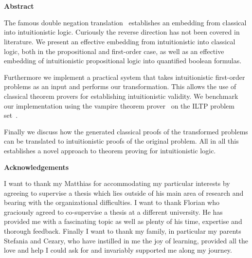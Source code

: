 \documentclass[a4paper,11pt]{report}
\theoremstyle{definition}
\theoremstyle{definition}
\theoremstyle{definition}
\theoremstyle{definition}
\theoremstyle{definition}
\theoremstyle{definition}
\theoremstyle{definition}
\begin{document}
	\newpage
	\
	\newpage
	
		
		\
		\vfill
		\onehalfspacing
		\begin{center}
		\bfseries Abstract		
		\end{center}
		The famous double negation translation~\cite{glivenko1929quelques, godel1933intuitionistischen} establishes an embedding from classical into intuitionistic logic. Curiously the reverse direction has not been covered in literature. We present an effective embedding from intuitionistic into classical logic, both in the propositional and first-order case, as well as an effective embedding of intuitionistic propositional logic into quantified boolean formulas.
		
		Furthermore we implement a practical system that takes intuitionistic first-order problems as an input and performs our transformation. This allows the use of classical theorem provers for establishing intuitionistic validity. We benchmark our implementation using the vampire theorem prover~\cite{kovacs2013first} on the ILTP problem set~\cite{iltp}.
		
		Finally we discuss how the generated classical proofs of the transformed problems can be translated to intuitionistic proofs of the original problem. All in all this establishes a novel approach to theorem proving for intuitionistic logic.

	\vspace*{1cm}
	\begin{center}
		\bfseries Acknowledgements		
	\end{center}
	
	I want to thank my Matthias for accommodating my particular interests by agreeing to supervise a thesis which lies outside of his main area of research and bearing with the organizational difficulties. I want to thank Florian who graciously agreed to co-supervise a thesis at a different university. He has provided me with a fascinating topic as well as plenty of his time, expertise and thorough feedback. Finally I want to thank my family, in particular my parents Stefania and Cezary, who have instilled in me the joy of learning, provided all the love and help I could ask for and invariably supported me along my journey.
	
\end{document}
